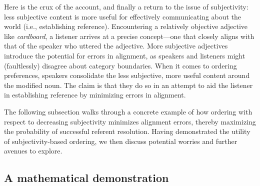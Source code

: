 \documentclass[preprint,authoryear]{elsarticle}\frenchspacing
\newcommand{\jd}[1]{\textcolor{Blue}{[jd: #1]}}
\begin{document}
Here is the crux of the account, and finally a return to the issue of subjectivity: less subjective content is more useful for effectively communicating about the world (i.e., establishing reference). %
Encountering a relatively objective adjective like \emph{cardboard}, a listener arrives at a precise concept---one that closely aligns with that of the speaker who uttered the adjective. More subjective adjectives introduce the potential for errors in alignment, as speakers and listeners might (faultlessly) disagree about category boundaries. When it comes to ordering preferences, speakers consolidate the less subjective, more useful content around the modified noun. The claim is that they do so in an attempt to aid the listener in establishing reference by minimizing errors in alignment. 

The following subsection walks through a concrete example of how ordering with respect to decreasing subjectivity minimizes alignment errors, thereby maximizing the probability of successful referent resolution. Having demonstrated the utility of subjectivity-based ordering, we then discuss potential worries and further avenues to explore.

\subsection{A mathematical demonstration}
\end{document}

